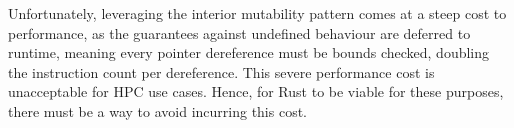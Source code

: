 

Unfortunately, leveraging the interior mutability pattern comes at a steep cost to performance, as the guarantees against undefined behaviour are deferred to runtime, meaning every pointer dereference must be bounds checked, doubling the instruction count per dereference.
This severe performance cost is unacceptable for \acrshort{HPC} use cases. Hence, for Rust to be viable for these purposes, there must be a way to avoid incurring this cost.

